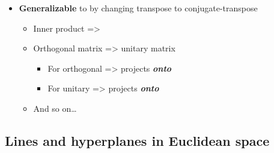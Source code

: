 \begin{itemize}
\begin{itemize}
  \item
     is \textbf{orthogonal}, i.e.~, so
    its a basis transformation
  \item
    ,
    are {[}{[}tutorial 1\#Projection properties\textbar orthogonal
    projections{]}{]} \textbf{onto} ,
     \emph{respectively}
  \item
    Notice:
  \end{itemize}
\item
  \textbf{Generalizable} to  by
  changing transpose to conjugate-transpose

  \begin{itemize}
  
  \item
    Inner product  =\textgreater{} 
  \item
    Orthogonal matrix  =\textgreater{} unitary
    matrix 

    \begin{itemize}
    
    \item
      For orthogonal
      =\textgreater{}  projects
      \textbf{\emph{onto}} 
    \item
      For unitary
      =\textgreater{} 
      projects \textbf{\emph{onto}} 
    \end{itemize}
  \item
    And so on\ldots{}
  \end{itemize}
\end{itemize}

\subsection*{\texorpdfstring{Lines and hyperplanes in Euclidean space
}{Lines and hyperplanes in Euclidean space }}

